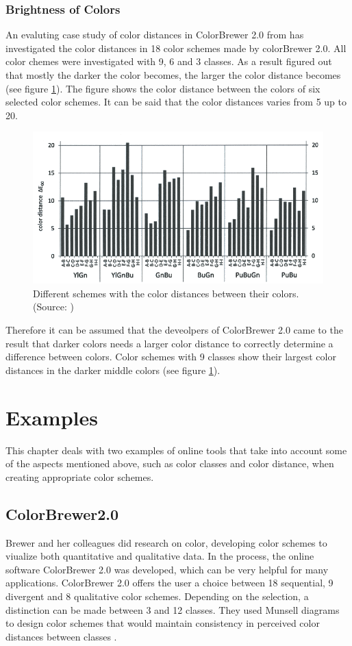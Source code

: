 \subsubsection{Brightness of Colors}

An evaluting case study of color distances in ColorBrewer 2.0 from \textcite{brychtovaC2017} has investigated the color distances in 18 color schemes made by colorBrewer 2.0. All color chemes were investigated with 9, 6 and 3 classes. As a result \textcite{brychtovaC2017} figured out that mostly the darker the color becomes, the larger the color distance becomes (see figure \ref{fig:colordist}). The figure shows the color distance between the colors of six selected color schemes. It can be said that the color distances varies from 5 up to 20.

\begin{figure}
	\centering
	\includegraphics[width=0.7\linewidth]{source/images/colordist}
	\caption{Different schemes with the color distances between their colors. \\ (Source: \textcite{brychtovaC2017})}
	\label{fig:colordist}
\end{figure}


Therefore it can be assumed that the deveolpers of ColorBrewer 2.0 came to the result that darker colors needs a larger color distance to correctly determine a difference between colors. Color schemes with 9 classes show their largest color distances in the darker middle colors (see figure \ref{fig:colordist}).

\section{Examples}
This chapter deals with two examples of online tools that take into account some of the aspects mentioned above, such as color classes and color distance, when creating appropriate color schemes. 

\subsection{ColorBrewer2.0}
Brewer and her colleagues \parencite{brewer2003, brewer1994, brewer1996, brewer1997, brewer1999} did research on color, developing color schemes to viualize both quantitative and qualitative data. In the process, the online software ColorBrewer 2.0 was developed, which can be very helpful for many applications. ColorBrewer 2.0 offers the user a choice between 18 sequential, 9 divergent and 8 qualitative color schemes. Depending on the selection, a distinction can be made between 3 and 12 classes. They used Munsell diagrams to design color schemes that would maintain consistency in perceived color distances between classes \parencite{brychtovaC2017}. 

